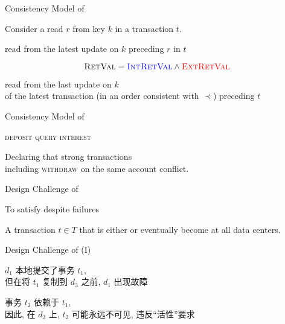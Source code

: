 \begin{frame}{Consistency Model of \unistore}
  \begin{center}
    Consider a read $r$ from key $k$ in a transaction $t$.

    \vspace{0.80cm}
    \blue{$\intretval:$} read from the latest update on $k$ preceding $r$ in $t$

    \[
      \textsc{RetVal} = \textcolor{blue}{\textsc{IntRetVal}} \land \textcolor{red}{\textsc{ExtRetVal}}
    \]

    \vspace{0.50cm}
    \red{$\extretval:$} read from the last update on $k$ \\[3pt]
    of the latest transaction (in an order consistent with $\prec$) preceding $t$
  \end{center}
\end{frame}

\begin{frame}{Consistency Model of \unistore}
  \begin{center}
    \textsc{deposit \quad {} \quad query \quad interest}

    \vspace{0.50cm}
    Declaring that strong transactions \\[3pt]
    including \textsc{withdraw} on the same account conflict.
  \end{center}
\end{frame}

\begin{frame}{Design Challenge of \unistore}
  \begin{center}
    {To satisfy  despite failures}

    \vspace{0.50cm}
    A transaction $t \in T$ that is either 
    or 
    eventually become  at all  data centers.
  \end{center}
\end{frame}

\begin{frame}{Design Challenge of \unistore{} (I)}
  \begin{center}
    $d_{1}$ 本地提交了事务 $t_{1}$, \\[3pt]
    但在将 $t_{1}$ 复制到 $d_{3}$ 之前, $d_{1}$ 出现故障

    \vspace{0.20cm}

    \pause
    事务 $t_{2}$ 依赖于 $t_{1}$, \\[3pt]
    因此, 在 $d_{3}$ 上, $t_{2}$ 可能永远不可见, 违反``活性''要求
  \end{center}
\end{frame}

